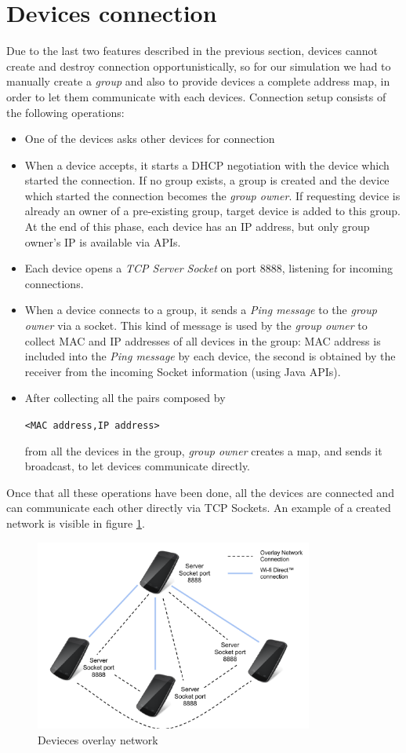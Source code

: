 \section{Devices connection}

Due to the last two \direct features described in the previous section, devices cannot create and destroy connection opportunistically, so for our simulation we had to 
manually create a \direct \textit{group} and also to provide devices a complete address map, in order to let them communicate with each
devices.
Connection setup consists of the following operations:
	\begin{itemize}
		\item One of the devices asks other devices for connection
		\item When a device accepts, it starts a DHCP negotiation with the device which started the connection. If no \direct group exists, a group is created and the device which started the connection becomes the \textit{group owner}. If requesting device is already an owner of a pre-existing group, target device is added to this group. At the end of this phase, each device has an IP address, but only group owner's IP is available via \direct APIs. 
		\item Each device opens a \textit{TCP Server Socket} on port 8888, listening for incoming connections.
		\item When a device connects to a group, it sends a \textit{Ping message} to the \textit{group owner} via a socket. This kind of message is used by the \textit{group owner} to collect MAC and IP addresses of all devices in the group: MAC address is included into the \emph{Ping message} by each device, the second is obtained by the receiver from the incoming Socket information (using Java APIs).
		\item After collecting all the pairs composed by \begin{center}\tt{<MAC address,IP address>}\end{center} from all the devices in the group, \textit{group owner} creates a map, and sends it broadcast, to let devices communicate directly.
	\end{itemize}
	
Once that all these operations have been done, all the devices are connected and can communicate each other directly via TCP Sockets. An example of a created network is visible in figure \ref{fig:device_network}.

\begin{figure}[!htbp]
\centering
\includegraphics[width=3.6in]{imgs/Devices_network.pdf}
\caption{Devieces overlay network}
\label{fig:device_network}
\end{figure}
